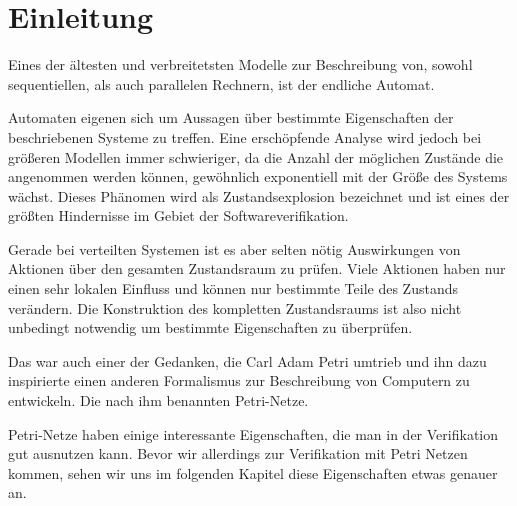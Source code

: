 \chapter{Einleitung}
\label{introduction}
Eines der ältesten und verbreitetsten Modelle zur Beschreibung von, sowohl sequentiellen, als auch parallelen Rechnern, ist der endliche Automat.

Automaten eigenen sich um Aussagen über bestimmte Eigenschaften der beschriebenen Systeme zu treffen.
Eine erschöpfende Analyse wird jedoch bei größeren Modellen immer schwieriger, da die Anzahl der möglichen Zustände die angenommen werden können, gewöhnlich exponentiell mit der Größe des Systems wächst.
Dieses Phänomen wird als Zustandsexplosion bezeichnet und ist eines der größten Hindernisse im Gebiet der Softwareverifikation.

Gerade bei verteilten Systemen ist es aber selten nötig Auswirkungen von Aktionen über den gesamten Zustandsraum zu prüfen.
Viele Aktionen haben nur einen sehr lokalen Einfluss und können nur bestimmte Teile des Zustands verändern.
Die Konstruktion des kompletten Zustandsraums ist also nicht unbedingt notwendig um bestimmte Eigenschaften zu überprüfen.

Das war auch einer der Gedanken, die Carl Adam Petri umtrieb und ihn dazu inspirierte einen anderen Formalismus zur Beschreibung von Computern zu entwickeln.
Die nach ihm benannten Petri-Netze.

Petri-Netze haben einige interessante Eigenschaften, die man in der Verifikation gut ausnutzen kann.
Bevor wir allerdings zur Verifikation mit Petri Netzen kommen, sehen wir uns im folgenden Kapitel diese Eigenschaften etwas genauer an.

